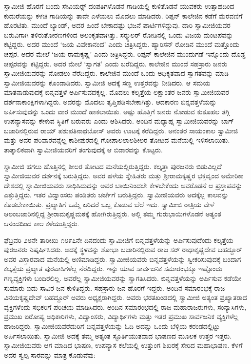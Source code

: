  ಸ್ವಾಮೀಜಿ ಹೊರಗೆ ಬಂದು ಸೇವಿಯರ್ಸ್‍‍ ದಂಪತಿಗಳೊಡನೆ ಗಾಡಿಯಲ್ಲಿ ಕುಳಿತೊಡನೆ ಯುವಕರು ಉತ್ಸಾಹದಿಂದ ಕುದುರೆಯನ್ನು ಕಳಚಿ ಗಾಡಿಯನ್ನು ತಾವೇ ಎಳೆಯಲು ಮೊದಲು ಮಾಡಿದರು. ರಿಪ್ಪನ್ ಕಾಲೇಜಿನ ಕಡೆಗೆ ಮೆರವಣಿಗೆ ಹೊರಟಿತು. ಮುಂದೆ ಬ್ಯಾಂಡ್, ಅದರ ಹಿಂದೆ ಬೇಕಾದಷ್ಟು ಭಜನೆ ಪಾರ್ಟಿಗಳಿದ್ದುವು. ದಾರಿ ಸ್ವಾಮೀಜಿಯವರ ಬರುವಿಗಾಗಿ ತಳಿರುತೋರಣಗಳಿಂದ ಅಲಂಕೃತವಾಗಿತ್ತು. ಸರ್‍ಕ್ಯುಲರ್ ರೋಡಿನಲ್ಲಿ ಒಂದು ವಿಜಯ ಮಂಟಪವನ್ನು ಕಟ್ಟಿದ್ದರು. ಅದರ ಮುಂದೆ ‘ಜಯ ವಿವೇಕಾನಂದ’ ಎಂದು ಚಿತ್ರಿಸಿದ್ದರು. ಹ್ಯಾರಿಸನ್ ರೋಡಿನ ಮುಂದೆ ಮತ್ತೊಂದು ಚಪ್ಪರ. ಅದರ ಮೇಲೆ ‘ಜಯ ರಾಮಕೃಷ್ಣ’ ಎಂದು ಚಿತ್ರಿಸಿದ್ದರು. ರಿಪ್ಪನ್ ಕಾಲೇಜಿನ ಮುಂದುಗಡೆ ಇನ್ನೊಂದು ದೊಡ್ಡ ಚಪ್ಪರವನ್ನು ಕಟ್ಟಿದ್ದರು. ಅದರ ಮೇಲೆ ‘ಸ್ವಾಗತ’ ಎಂದು ಬರೆದಿದ್ದರು. ಕಾಲೇಜಿನ ಮುಂದೆ ಸಹಸ್ರಾರು ಜನರು ಸ್ವಾಮೀಜಿಯವರನ್ನು ನೋಡಲು ನೆರೆದಿದ್ದರು. ಕಾಲೇಜಿನ ಮುಂದೆ ಒಂದು ಅಧಿಕೃತವಾದ ಸ್ವಾಗತವನ್ನು ಮಾಡಿ ಸ್ವಾಮೀಜಿಯವರನ್ನು ಕೊಂಡಾಡಿದರು. ಸ್ವಾಮೀಜಿ ಅದಕ್ಕೆ ಸಣ್ಣ ಉತ್ತರವನ್ನು ನೀಡಿದರು. ಆ ಸಮಯ ಮಾತನಾಡುವುದಕ್ಕೆ ಬಿನ್ನವತ್ತಳೆ ಅರ್ಪಿಸುವದಕ್ಕಲ್ಲ. ಮೊದಲು ಕಲ್ಕತ್ತೆಯ ಲಕ್ಷಾಂತರ ಜನರು ಸ್ವಾಮೀಜಿಯವರ ದರ್ಶನಾಕಾಂಕ್ಷಿಗಳಾಗಿದ್ದರು. ಅವರನ್ನು ಮೊದಲು ತೃಪ್ತಿಪಡಿಸಬೇಕಾಗಿತ್ತು. ಆದಕಾರಣ ಬಿನ್ನವತ್ತಳೆಯನ್ನು ಅರ್ಪಿಸುವುದನ್ನು ಒಂದು ವಾರ ಮುಂದೆ ಹಾಕಲಾಯಿತು. ಅಷ್ಟು ಹೊತ್ತಿಗೆ ಜನರು ನೋಡುವ ಕುತೂಹಲ ತಗ್ಗಿ ಉಪನ್ಯಾಸವನ್ನು ಕೇಳುವ ಸ್ಥಿತಿಗೆ ಬರುವರು ಎಂದು ಆಶಿಸಿದರು. ಅಂದಿನ ಮಧ್ಯಾಹ್ನ ಸ್ವಾಮೀಜಿಯವರನ್ನು ಬಾಗ್ ಬಜಾರಿನಲ್ಲಿರುವ ರಾಯ್ ಪಶುಪತಿನಾಥಬೋಸ್ ಅವರು ಊಟಕ್ಕೆ ಕರೆದಿದ್ದರು. ಅನಂತರ ಸಾಯಂಕಾಲ ಸ್ವಾಮೀಜಿ ಮತ್ತು ಅವರ ಪರಿವಾರವನ್ನೆಲ್ಲ ಕಾಶೀಪುರದಲ್ಲಿ ಗೋಪಾಲಲಾಲಶೀಲರ ತೋಟದ ಮನೆಯಲ್ಲಿ ಇಳಿಸಲಾಯಿತು. ತಾತ್ಕಾಲಿಕವಾಗಿ ಸ್ವಾಮೀಜಿಯವರಿಗೆ ತಂಗುವುದಕ್ಕೆ ಆ ಬಿಡಾರವನ್ನು ಕೊಟ್ಟರು. 

 ಸ್ವಾಮೀಜಿ ಹಗಲು ಹೊತ್ತಿನಲ್ಲಿ ಶೀಲರ ತೋಟದ ಮನೆಯಲ್ಲಿರುತ್ತಿದ್ದರು. ಕಲ್ಕತ್ತಾ ಪುರಜನರು ಬಿಡುವಿಲ್ಲದೆ ಸ್ವಾಮೀಜಿಯವರ ದರ್ಶನಕ್ಕೆ ಬರುತ್ತಿದ್ದರು. ಅವರ ಹಳೆಯ ಸ್ನೇಹಿತರು ಮತ್ತು ಶ‍್ರೀರಾಮಕೃಷ್ಣರ ಭಕ್ತವೃಂದ ಅಮೇರಿಕಾ ದೇಶದಲ್ಲಿ ಸ್ವಾಮೀಜಿಯವರು ಸಾಧಿಸಿದುದನ್ನು ಅವರ ಬಾಯಿನಿಂದಲೇ ಕೇಳಬೇಕೆಂದು ಅವರೊಡನೆ ಆ ಪ್ರಸ್ತಾಪವನ್ನು ಎತ್ತುತ್ತಿದ್ದರು. ಇತರ ವಿದ್ವಾಂಸರು ಪಂಡಿತರು ಚರ್ಚೆಗೆ ಬರುತ್ತಿದ್ದರು. ಸ್ವಾಮೀಜಿಯವರು ಅದಕ್ಕೆಲ್ಲ ಕಾಲವನ್ನು ಕೊಡಬೇಕಾಯಿತು. ಪ್ರಖ್ಯಾತಿಗೆ ಒಮ್ಮೆ ಏರಿದರೆ ಒಬ್ಬ ಕೊಡುವ ಬೆಲೆ ಇದು. ಸ್ವಾಮೀಜಿ ರಾತ್ರಿಯ ವೇಳೆ ಆಲಂಬಜಾರಿನಲ್ಲಿದ್ದ ಶ‍್ರೀರಾಮಕೃಷ್ಣಮಠಕ್ಕೆ ಹೋಗಿರುತ್ತಿದ್ದರು. ಅಲ್ಲಿ ತಮ್ಮ ಗುರುಭಾಯಿಗಳೊಡನೆ ಅತ್ಯಂತ ಆನಂದದಿಂದ ಕಾಲ ಕಳೆಯುತ್ತಿದ್ದರು. 

 ಫೆಬ್ರವರಿ ೨೮ನೇ ತಾರೀಖು ೧೮೯೭ನೇ ದಿನದಂದು ಸ್ವಾಮೀಜಿಗೆ ಬಿನ್ನವತ್ತಳೆಯನ್ನು ಅರ್ಪಿಸುವುದೆಂದು ಕಲ್ಕತ್ತೆಯ ಪುರಜನರು ನಿಷ್ಕರ್ಷಿಸಿದರು. ಅದಕ್ಕೆ ಸ್ಥಳವನ್ನು ಶೋಭಾ ಬಜಾರಿನಲ್ಲಿರುವ ರಾಜ ಸರ್ ರಾಧಾಕೃಷ್ಣದೇವ ಬಹದ್ದೂರ್ ಅವರ ವಿಸ್ತಾರವಾದ ಮನೆಯಲ್ಲಿ ಅಣಿಮಾಡಿದ್ದರು. ಸ್ವಾಮೀಜಿಯವರು ಬಿನ್ನವತ್ತಳೆಯನ್ನು ಸ್ವೀಕರಿಸುವುದಕ್ಕೆ ಬಂದಾಗ ಕಲ್ಕತ್ತೆಯ ಪ್ರಖ್ಯಾತ ಪುರವಾಸಿಗಳೆಲ್ಲ ನೆರೆದಿದ್ದರು. ಇನ್ನು ಯಾವ ಸಾರ್ವಜನಿಕ ಸಮಾರಂಭಕ್ಕೂ ಇಷ್ಟೊಂದು ಗಣ್ಯವ್ಯಕ್ತಿಗಳು ಬಂದಿರಲಿಲ್ಲ. ಅವರೆಲ್ಲ ಸ್ವಾಮೀಜಿಯವರನ್ನು ಸ್ವಾಗತಿಸಿದರು. ಬಿನ್ನವತ್ತಳೆಯನ್ನು ಅರ್ಪಿಸುವ ಕಡೆಯೇ ಸುಮಾರು ಐದು ಸಾವಿರ ಜನ ಕುಳಿತಿದ್ದರು. ಸಹಸ್ರಾರು ಜನ ಹೊರಗೆ ಇದ್ದರು. ಅಂದಿನ ಸಮಾರಂಭಕ್ಕೆ ರಾಜ ವಿನಯಕೃಷ್ಣದೇವ್ ಬಹದ್ದೂರ್ ಅವರು ಅಧ್ಯಕ್ಷರಾಗಿದ್ದರು. ಅವರು ಭರತಖಂಡದಲ್ಲಿ ಸ್ವಾಮೀಜಿ ಅತ್ಯಂತ ಪ್ರಖ್ಯಾತರಾದ ವ್ಯಕ್ತಿಗಳೆಂದು ಸಭಿಕರಿಗೆ ಪರಿಚಯ ಮಾಡಿಸಿದರು. ಅಂದಿನ ಸಮಾರಂಭದಲ್ಲಿ ರಾಜ ಮಹಾರಾಜರುಗಳು, ಸಂನ್ಯಾಸಿಗಳು, ಪ್ರಮುಖ ಐರೋಪ್ಯ ಅಧಿಕಾರಿಗಳು, ವಿದ್ವಾಂಸರು, ವಿದ್ಯಾರ್ಥಿಗಳು ಮತ್ತು ಇತರ ಪ್ರಮುಖ ಸಾರ್ವಜನಿಕ ವ್ಯಕ್ತಿಗಳೆಲ್ಲ ಹಾಜರಿದ್ದರು. ಸ್ವಾಮೀಜಿಯವರೆದುರಿಗೆ ಬಿನ್ನವತ್ತಳೆಯನ್ನು ಓದಿ ಅದನ್ನು ಒಂದು ಬೆಳ್ಳಿಯ ಕರಂಡದಲ್ಲಿಟ್ಟು ಅರ್ಪಿಸಲಾಯಿತು. ಸ್ವಾಮೀಜಿ ಅದಕ್ಕೆ ತಮ್ಮ ಅತ್ಯಂತ ಸ್ಫೂರ್ತಿಯುತವಾದ ಭಾಷಣದ ಮೂಲಕ ಉತ್ತರ ಇತ್ತರು. ಸ್ವಾಮೀಜಿಯವರು ಆಗ ಮಾಡಿದ ಭಾಷಣ, ಉಪನ್ಯಾಸ ಕಲೆಯಲ್ಲಿ ಉತ್ತುಂಗ ಶಿಖರಕ್ಕೆ ಸೇರಿದ ಮಹಾಭಾಷಣ. ಕೆಳಗೆ ಅದರ ಸ್ವಲ್ಪ ಸಾರವನ್ನು ಮಾತ್ರ ಕೊಡುವೆವು: 

